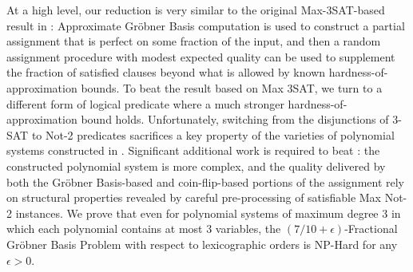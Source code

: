 \documentclass{article}
\begin{document}
\begin{figure}[h!]
{\begin{minipage}{11.8 cm}
\end{minipage}
}
\end{figure}










At a high level, our reduction is very similar to the original Max-3SAT-based result  in \citep{RS}: Approximate Gr\"{o}bner Basis computation is used to construct a partial assignment that is perfect on some fraction of the input, and then a random assignment procedure with modest expected quality can be used to supplement the fraction of satisfied clauses beyond what is allowed by known hardness-of-approximation bounds.
To beat the result based on Max 3SAT, we turn to a different form of logical predicate where a much stronger hardness-of-approximation bound holds. Unfortunately, switching from the disjunctions of 3-SAT to Not-2 predicates sacrifices a key property of the varieties of polynomial systems constructed in \citep{RS}. Significant additional work is required to beat \citep{RS}: the constructed polynomial system is more complex, and the quality delivered by both the Gr\"{o}bner Basis-based and coin-flip-based portions of the assignment rely on structural properties revealed by careful pre-processing of satisfiable Max Not-2 instances. We prove that even for polynomial systems of maximum degree 3 in which each polynomial contains at most 3 variables, the $(7/10+\epsilon)$-Fractional Gr\"{o}bner Basis Problem with respect to lexicographic orders is NP-Hard for any $\epsilon>0$.
\end{document}
